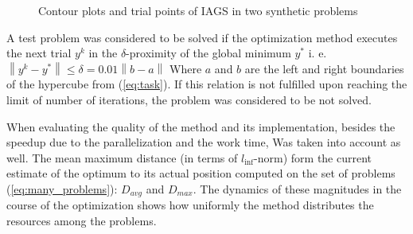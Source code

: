 \documentclass[runningheads]{llncs}
\begin{document}
\begin{figure}[ht]
    \centering
    \caption{Contour plots and trial points of IAGS in two synthetic problems}
    \label{fig:isolines}
\end{figure}

A test problem was considered to be solved if the optimization method executes the next trial
\(y^k\) in the \(\delta\)-proximity of the global minimum \(y^*\) i. e.
\(\left\|y^k-y^*\right\|\leqslant \delta = 0.01\left\|b-a\right\|\)
Where \(a\) and \(b\) are the left and right boundaries of the hypercube from (\ref{eq:task}).
If this relation is not fulfilled upon reaching the limit of number of iterations, the problem was
considered to be not solved.

When evaluating the quality of the method and its implementation, besides the speedup due to
the parallelization and the work time,
Was taken into account as well.
The mean maximum distance (in terms of \(l_{\inf}\)-norm) form the current estimate of the
optimum to its actual position computed on the set of problems (\ref{eq:many_problems}):
\(D_{avg}\) and \(D_{max}\).
The dynamics of these magnitudes in the course of the optimization shows how uniformly the
method distributes the resources among the problems.
\end{document}
